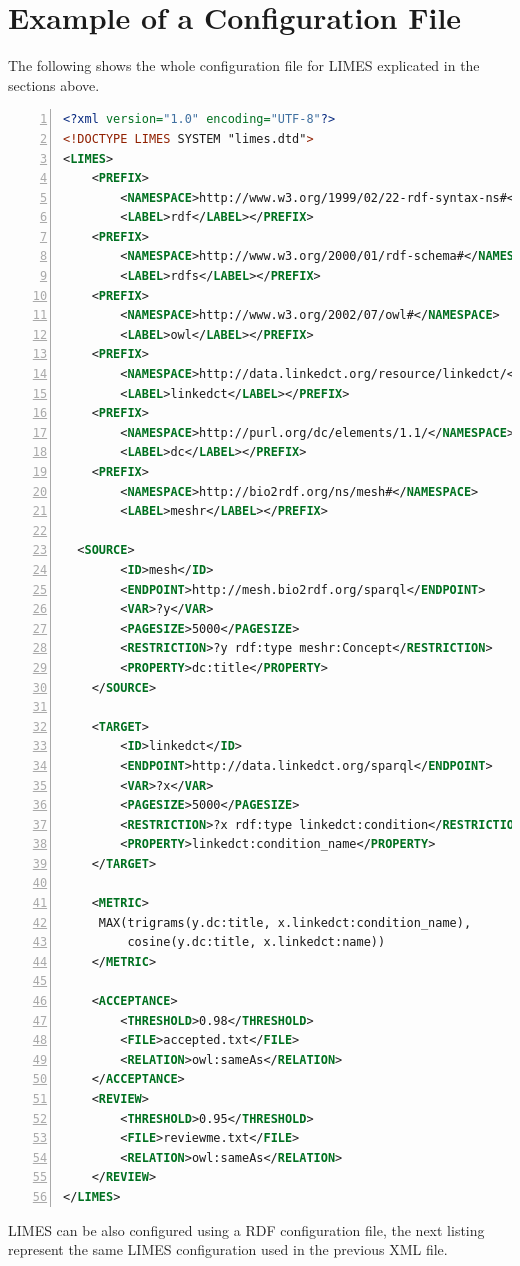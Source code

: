 \documentclass[a4paper, 11pt]{article}
\begin{document}
\section{Example of a Configuration File}
The following shows the whole configuration file for LIMES explicated in the sections above.

\begin{ttfamily}
\begin{lstlisting}[language=XML,basicstyle=\scriptsize,numbers=left,numberstyle=\tiny]
<?xml version="1.0" encoding="UTF-8"?>
<!DOCTYPE LIMES SYSTEM "limes.dtd">
<LIMES>
	<PREFIX>
		<NAMESPACE>http://www.w3.org/1999/02/22-rdf-syntax-ns#</NAMESPACE>
		<LABEL>rdf</LABEL></PREFIX>
	<PREFIX>
		<NAMESPACE>http://www.w3.org/2000/01/rdf-schema#</NAMESPACE>
		<LABEL>rdfs</LABEL></PREFIX>
	<PREFIX>
		<NAMESPACE>http://www.w3.org/2002/07/owl#</NAMESPACE>
		<LABEL>owl</LABEL></PREFIX>
	<PREFIX>
		<NAMESPACE>http://data.linkedct.org/resource/linkedct/</NAMESPACE>
		<LABEL>linkedct</LABEL></PREFIX>
	<PREFIX>
		<NAMESPACE>http://purl.org/dc/elements/1.1/</NAMESPACE>
		<LABEL>dc</LABEL></PREFIX>
	<PREFIX>
		<NAMESPACE>http://bio2rdf.org/ns/mesh#</NAMESPACE>
		<LABEL>meshr</LABEL></PREFIX>
		
  <SOURCE>
		<ID>mesh</ID>
		<ENDPOINT>http://mesh.bio2rdf.org/sparql</ENDPOINT>
		<VAR>?y</VAR>
		<PAGESIZE>5000</PAGESIZE>
		<RESTRICTION>?y rdf:type meshr:Concept</RESTRICTION>
		<PROPERTY>dc:title</PROPERTY>
	</SOURCE>
		
	<TARGET>
		<ID>linkedct</ID>
		<ENDPOINT>http://data.linkedct.org/sparql</ENDPOINT>
		<VAR>?x</VAR>
		<PAGESIZE>5000</PAGESIZE>
		<RESTRICTION>?x rdf:type linkedct:condition</RESTRICTION>
		<PROPERTY>linkedct:condition_name</PROPERTY>
	</TARGET>	

	<METRIC>
	 MAX(trigrams(y.dc:title, x.linkedct:condition_name), 
	     cosine(y.dc:title, x.linkedct:name))
	</METRIC>

	<ACCEPTANCE>
		<THRESHOLD>0.98</THRESHOLD>
		<FILE>accepted.txt</FILE>
		<RELATION>owl:sameAs</RELATION>
	</ACCEPTANCE>
	<REVIEW>
		<THRESHOLD>0.95</THRESHOLD>
		<FILE>reviewme.txt</FILE>
		<RELATION>owl:sameAs</RELATION>
	</REVIEW>
</LIMES>
\end{lstlisting}
\end{ttfamily}

LIMES can be also configured using a RDF configuration file, the next listing represent the same LIMES configuration used in the previous XML file.
 
\end{document}
